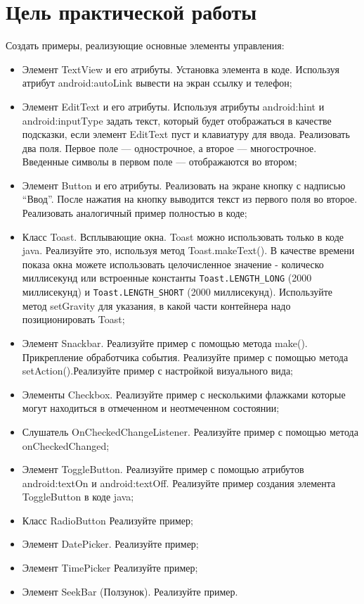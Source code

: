 \graphicspath{{./img}}
\section*{\LARGE{Цель практической работы}}
Создать примеры, реализующие основные элементы управления:

\begin{itemize}
	\item Элемент TextView и его атрибуты. Установка элемента в коде.
		Используя атрибут android:autoLink вывести на экран ссылку и телефон;
	\item Элемент EditText и его атрибуты. Используя атрибуты
		android:hint и android:inputType задать текст, который будет
		отображаться в качестве подсказки, если элемент EditText пуст
		и клавиатуру для ввода. Реализовать два поля.
		Первое поле --- однострочное, а второе --- многострочное.
		Введенные символы в первом поле --- отображаются во втором;
	\item Элемент Button и его атрибуты. Реализовать на экране кнопку с
		надписью “Ввод”. После нажатия на кнопку выводится текст из первого
		поля во второе. Реализовать аналогичный пример полностью в коде;
	\item Класс Toast. Всплывающие окна. Toast можно использовать
		только в коде java. Реализуйте это, используя метод Toast.makeText().
		В качестве времени показа окна можете использовать целочисленное
		значение - колическо миллисекунд или встроенные константы
		\verb|Toast.LENGTH_LONG| (2000 миллисекунд)
		и \verb|Toast.LENGTH_SHORT| (2000 миллисекунд).
		Используйте метод setGravity для указания, в какой части
		контейнера надо позиционировать Toast;
	\item Элемент Snackbar. Реализуйте пример с помощью метода make().
		Прикрепление обработчика события. Реализуйте пример с помощью метода
		setAction().Реализуйте пример с настройкой визуального вида;
	\item Элементы Checkbox. Реализуйте пример с несколькими
		флажками которые могут находиться в отмеченном и неотмеченном
		состоянии;
	\item Слушатель OnCheckedChangeListener. Реализуйте пример с
		помощью метода onCheckedChanged;
	\item Элемент ToggleButton. Реализуйте пример с помощью атрибутов
		android:textOn и android:textOff. Реализуйте пример создания элемента
		ToggleButton в коде java;
	\item Класс RadioButton Реализуйте пример;
	\item Элемент DatePicker. Реализуйте пример;
	\item Элемент TimePicker Реализуйте пример;
	\item Элемент SeekBar (Ползунок). Реализуйте пример.
\end{itemize}

